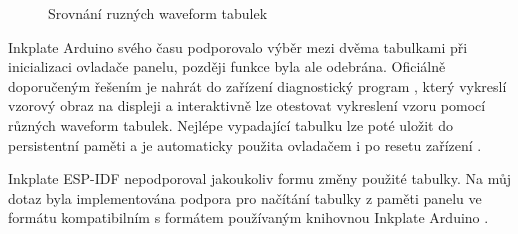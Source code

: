 \begin{figure}[h]
    \centering
    \caption{Srovnání ruzných waveform tabulek}
	\label{fig:waveform-comparison}
\end{figure}

Inkplate Arduino svého času podporovalo výběr mezi dvěma tabulkami při inicializaci ovladače panelu, později funkce byla ale odebrána. Oficiálně doporučeným řešením je nahrát do zařízení diagnostický program \cite{InkplateArduinolibraryExamplesInkplate10}, který vykreslí vzorový obraz na displeji a interaktivně lze otestovat vykreslení vzoru pomocí různých waveform tabulek. Nejlépe vypadající tabulku lze poté uložit do persistentní paměti a je automaticky použita ovladačem i po resetu zařízení \cite{Inkplate10Washed}.

Inkplate ESP-IDF nepodporoval jakoukoliv formu změny použité tabulky. Na můj dotaz byla implementována podpora pro načítání tabulky z paměti panelu ve formátu kompatibilním s formátem používaným knihovnou Inkplate Arduino \cite{FeatureAddLightWaveform}.


